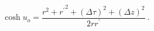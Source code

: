 \begin{equation}
\cosh u_{o}=\frac{r^2+{r^{'}}^{2}+(\Delta \tau)^{2}+(\Delta z)^{2}}{2rr^{'}} \ .
\label{20}
\end{equation}

